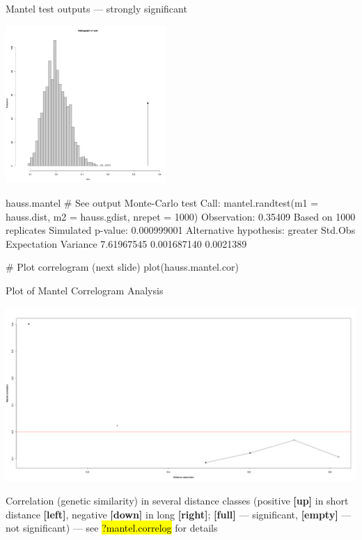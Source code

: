 \documentclass[compress, ucs, xelatex, 11pt, xcolor=svgnames,
	hyperref={
		bookmarks=true,
		unicode=true,
		colorlinks=true,
		pdftitle={Molecular data in R},
		plainpages=false,
		pdfauthor={Vojtech Zeisek},
		pdfsubject={Course about phylogeny and evolution in R},
		pdfcreator={XeLaTeX},
		pdfkeywords={R, evolution, phylogeny, molecular data},
		linkcolor=Tomato,
		anchorcolor=SaddleBrown,
		citecolor=Goldenrod,
		filecolor=DarkMagenta,
		menucolor=Sienna,
		urlcolor=DarkTurquoise,
		pdftex},
	url={hyphens, lowtilde} %
	]{beamer}
\renewcommand{\texttt}[1]{\hl{\ttfamily #1}}
\begin{document}
\begin{frame}[fragile]{Mantel test outputs --- strongly significant}
	\begin{multicols}{2}
		\includegraphics[height=6cm]{mantel.png}
		\begin{spluscode}
    hauss.mantel # See output
    Monte-Carlo test
    Call: mantel.randtest(m1 =
      hauss.dist, m2 =
      hauss.gdist, nrepet = 1000)
    Observation: 0.35409
    Based on 1000 replicates
    Simulated p-value: 0.000999001
    Alternative hypothesis: greater
      Std.Obs Expectation  Variance
    7.61967545 0.001687140 0.0021389
		\end{spluscode}
		\vfill
		\begin{spluscode}
    # Plot correlogram (next slide)
    plot(hauss.mantel.cor)
		\end{spluscode}
	\end{multicols}
\end{frame}

\begin{frame}{Plot of Mantel Correlogram Analysis}
	\vfil
	\begin{center}
		\includegraphics[width=\textwidth-1cm]{mantel-cor.png}
	\end{center}
	\vfil
	Correlation (genetic similarity) in several distance classes (positive \textbf{[up]} in short distance \textbf{[left]}, negative \textbf{[down]} in long \textbf{[right]}; \textbf{[full]} --- significant, \textbf{[empty]} --- not significant) --- see \texttt{?mantel.correlog} for details
	\vfill
\end{frame}
\end{document}
